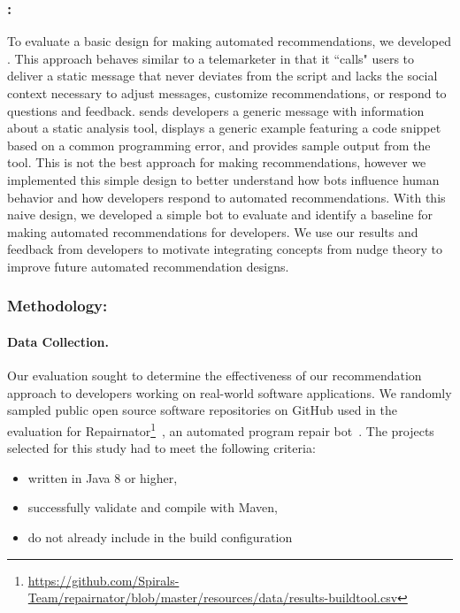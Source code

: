 \subsubsection{\tele:}

To evaluate a basic design for making automated recommendations, we developed \tele. This approach behaves similar to a telemarketer in that it ``calls" users to deliver a static message that never deviates from the script and lacks the social context necessary to adjust messages, customize recommendations, or respond to questions and feedback. \tele sends developers a generic message with information about a static analysis tool, displays a generic example featuring a code snippet based on a common programming error, and provides sample output from the tool. This is not the best approach for making recommendations, however we implemented this simple design to better understand how bots influence human behavior and how developers respond to automated recommendations. With this naive design, we developed a simple bot to evaluate and identify a baseline for making automated recommendations for developers. We use our results and feedback from developers to motivate integrating concepts from nudge theory to improve future automated recommendation designs. 

\subsubsection{Methodology:}

\paragraph{Data Collection.}

Our evaluation sought to determine the effectiveness of our \tele recommendation approach to developers working on real-world software applications. We randomly sampled public open source software repositories on GitHub used in the evaluation for Repairnator\footnote{\url{https://github.com/Spirals-Team/repairnator/blob/master/resources/data/results-buildtool.csv}}~\cite{Repairnator}, an automated program repair bot~\cite{Repairnator}. The projects selected for this study had to meet the following criteria:

\begin{itemize}
    \item written in Java 8 or higher,
    \item successfully validate and compile with Maven,
    \item do not already include \EP in the build configuration
\end{itemize}

